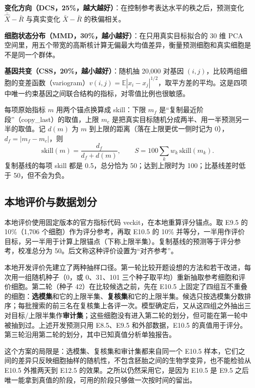 \documentclass[UTF8,zihao=-4,fontset=none,a4paper]{ctexart}
\begin{document}
\textbf{变化方向（DCS，25\%，越大越好）}：在控制参考表达水平的秩之后，预测变化 $\bar{\hat X}-\bar R$ 与真实变化 $\bar X-\bar R$ 的秩偏相关。

\textbf{细胞状态分布（MMD，30\%，越小越好）}：在只用真实目标拟合的 30 维 PCA 空间里，用五个带宽的高斯核计算无偏最大均值差异\cite{gretton}，衡量预测细胞和真实细胞是不是同一个群体。

\textbf{基因共变（CSS，20\%，越小越好）}：随机抽 20,000 对基因 $(i,j)$，比较两组细胞的变差函数（variogram）$v(i,j)=\mathbb E|x_i-x_j|^{1/2}$，取平方差的平均\cite{scheuerer}。这是四项中唯一约束基因之间联合结构的指标，对零值比例也很敏感。

每项原始指标 $m$ 用两个锚点换算成 skill：下限 $m_f$ 是“复制最近阶段”（copy\_last）的取值，上限 $m_c$ 是把真实目标随机分成两半、用一半预测另一半的取值。记 $d(m)$ 为 $m$ 到上限的距离（落在上限更优一侧时记为 0），$d_f=|m_f-m_c|$，则
\begin{equation}
\mathrm{skill}(m)=\frac{d_f}{d_f+d(m)},\qquad S=100\sum_k w_k\,\mathrm{skill}(m_k).
\end{equation}
复制基线的每项 skill 都是 0.5，总分恰为 50；达到上限时为 100；比基线差时低于 50，但不会为负。

\subsection{本地评价与数据划分}

本地评价使用固定版本的官方指标代码 veckit\cite{veckit}，在本地重算评分锚点。取 E9.5 的 10\%（1,706 个细胞）作为评分参考，再取 E10.5 的 10\% 并等分，一半用作评价目标，另一半用于计算上限锚点（下称上限半集）。复制基线的预测等于评分参考，校准总分为 50。后文称这种评价设置为“对齐参考”。

本地开发评价先建立了两种抽样口径。第一轮比较开题设想的方法和若干改进，每次用一组随机种子（0，或 0、31、101 三个种子取平均）重新抽取参考细胞和评价细胞。第二轮（种子 42）在比较候选之前，先在 E10.5 上固定了四组互不重叠的细胞：\textbf{选模集}和它的上限半集、\textbf{复核集}和它的上限半集。候选只按选模集分数排序；每批搜索的前三名在复核集上各评一次。模型确定后，又从这四组之外抽出三对目标/上限半集作\textbf{审计集}；这些细胞没有进入第二轮的划分，但可能在第一轮中被抽到过。上述开发预测只用 E8.5、E9.5 和外部数据，E10.5 的真值用于评分。第三轮沿用第二轮的划分，其中已知真值分析单独报告。

这个方案的局限是：选模集、复核集和审计集都来自同一个 E10.5 样本，它们之间的差异只反映细胞抽样的随机性，不包含胚胎之间的生物学变异，也不能检验从 E10.5 外推两天到 E12.5 的效果。之所以仍然采用它，是因为 E10.5 是 E9.5 之后唯一能拿到真值的阶段，可用的阶段只够做一次按时间的留出。
\end{document}
